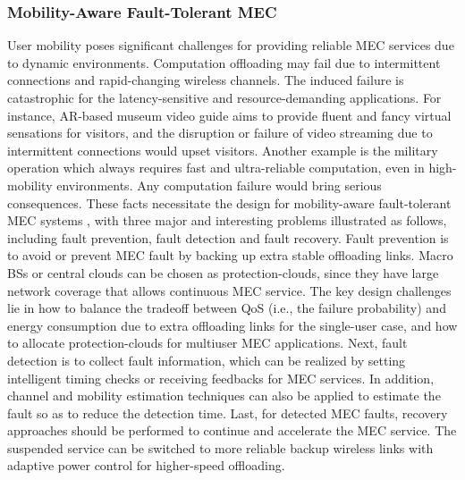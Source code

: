 \documentclass[journal]{IEEEtran}
\begin{document}
{\subsubsection{\textbf{Mobility-Aware Fault-Tolerant MEC}} User mobility poses significant challenges for providing reliable MEC services due to dynamic environments. Computation offloading may fail due to intermittent connections and rapid-changing wireless channels. The induced failure is catastrophic for the latency-sensitive and resource-demanding applications. For instance, AR-based museum video guide aims to provide fluent and fancy virtual sensations for visitors, and the disruption or failure of video streaming due to intermittent connections would upset visitors. Another example is the military operation which always requires fast and ultra-reliable computation, even in high-mobility environments. Any computation failure would bring serious consequences. These facts necessitate the design for mobility-aware fault-tolerant MEC systems \cite{chen2015energy,chenenergy,satria2017recovery}, with three major and interesting problems illustrated as follows, including fault prevention, fault detection and fault recovery. Fault prevention is to avoid or prevent MEC fault by backing up extra stable offloading links. Macro BSs or central clouds can  be chosen as protection-clouds, since they have large network coverage that allows continuous MEC service. The key design challenges lie in how to balance the tradeoff between QoS (i.e., the failure probability) and energy consumption due to extra offloading links for the single-user case, and how to allocate protection-clouds for multiuser MEC applications. Next, fault detection is to collect fault information, which can be realized by setting intelligent timing checks or receiving feedbacks for MEC services. In addition, channel and mobility estimation techniques can also be applied to estimate the fault so as to reduce the detection time. Last, for detected MEC faults, recovery approaches should be performed to continue and accelerate the MEC service. The suspended service can be switched to more reliable backup wireless links with adaptive power control for higher-speed offloading. {}

}
\end{document}

